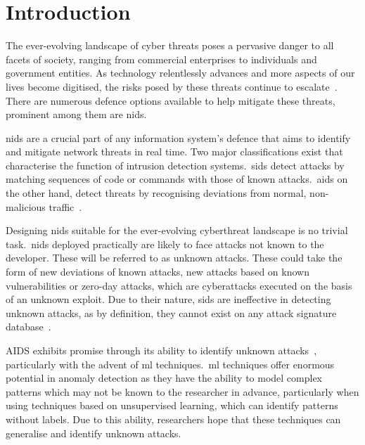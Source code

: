 \chapter{Introduction}%
\label{chp:introduction}


The ever-evolving landscape of cyber threats poses a pervasive danger to all
facets of society, ranging from commercial enterprises to individuals and
government entities. As technology relentlessly advances and more aspects of
our lives become digitised, the risks posed by these threats continue to
escalate~\cite{ENISA}. There are numerous defence options available to help
mitigate these threats, prominent among them are \gls{nids}.

\gls{nids} are a crucial part of any information system's defence that aims to
identify and mitigate network threats in real time. Two major classifications
exist that characterise the function of intrusion detection systems.\ \gls{sids}
detect attacks by matching sequences of code or commands with those of known
attacks.\ \gls{aids} on the other hand, detect threats by recognising
deviations from normal, non-malicious traffic~\cite{survey1}.

Designing \gls{nids} suitable for the ever-evolving cyberthreat landscape is no
trivial task.\ \gls{nids} deployed practically are likely to face attacks not
known to the developer. These will be referred to as unknown attacks. These
could take the form of new deviations of known attacks, new attacks based on
known vulnerabilities or zero-day attacks, which are cyberattacks executed on
the basis of an unknown exploit. Due to their nature, \gls{sids} are
ineffective in detecting unknown attacks, as by definition, they cannot exist
on any attack signature database~\cite{survey1}.

AIDS exhibits promise through its ability to identify unknown
attacks~\cite{aids-unknown}, particularly with the advent of \gls{ml}
techniques.\ \gls{ml} techniques offer enormous potential in anomaly detection
as they have the ability to model complex patterns which may not be known to
the researcher in advance, particularly when using techniques based on
unsupervised learning, which can identify patterns without labels. Due to this
ability, researchers hope that these techniques can generalise and identify
unknown attacks.%

